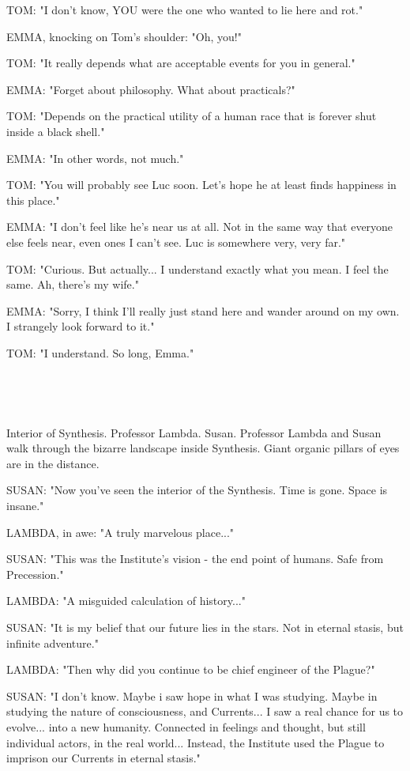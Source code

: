 \documentclass[11pt]{article}
\begin{document}
TOM: "I don't know, YOU were the one who wanted to lie here and rot."

EMMA, knocking on Tom's shoulder: "Oh, you!"

TOM: "It really depends what are acceptable events for you in general."

EMMA: "Forget about philosophy.
What about practicals?"

TOM: "Depends on the practical utility of a human race that is forever shut inside a black shell."

EMMA: "In other words, not much."

TOM: "You will probably see Luc soon.
Let's hope he at least finds happiness in this place."

EMMA: "I don't feel like he's near us at all.
Not in the same way that everyone else feels near, even ones I can't see.
Luc is somewhere very, very far."

TOM: "Curious. But actually... I understand exactly what you mean.
I feel the same.
Ah, there's my wife."

EMMA: "Sorry, I think I'll really just stand here and wander around on my own.
I strangely look forward to it."

TOM: "I understand. So long, Emma."

\ 

\ 

Interior of Synthesis.
Professor Lambda. Susan. 
Professor Lambda and Susan walk through the bizarre landscape inside Synthesis.
Giant organic pillars of eyes are in the distance.

SUSAN: "Now you've seen the interior of the Synthesis.
Time is gone. Space is insane."

LAMBDA, in awe: "A truly marvelous place..."

SUSAN: "This was the Institute's vision - the end point of humans. 
Safe from Precession."

LAMBDA: "A misguided calculation of history..."

SUSAN: "It is my belief that our future lies in the stars. 
Not in eternal stasis, but infinite adventure."

LAMBDA: "Then why did you continue to be chief engineer of the Plague?"

SUSAN: "I don't know. 
Maybe i saw hope in what I was studying.
Maybe in studying the nature of consciousness, and Currents...
I saw a real chance for us to evolve...
into a new humanity.
Connected in feelings and thought, but still individual actors, in the real world...
Instead, the Institute used the Plague to imprison our Currents in eternal stasis."
\end{document}
